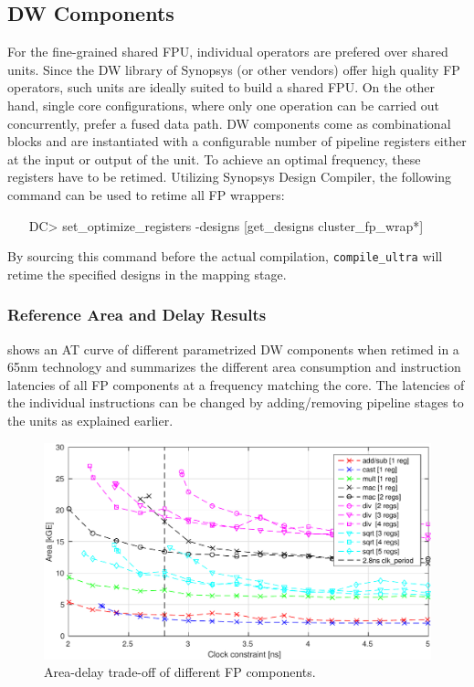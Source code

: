 \documentclass[%
 oneside,      %
 openany,      %
 halfparskip,  %
]{scrbook}
\begin{document}
\subsection{DW Components}

For the fine-grained shared FPU, individual operators are prefered over shared units. Since the DW library of Synopsys (or other vendors) offer high quality FP operators, such units are ideally suited to build a shared FPU. On the other hand, single core configurations, where only one operation can be carried out concurrently, prefer a fused data path.
DW components come as combinational blocks and are instantiated with a configurable number of pipeline registers either at the input or output of the unit. To achieve an optimal frequency, these registers have to be retimed. Utilizing Synopsys Design Compiler, the following command can be used to retime all FP wrappers:

\begin{itemize}
\item [DC>] set\_optimize\_registers -designs [get\_designs cluster\_fp\_wrap*]
\end{itemize}

By sourcing this command before the actual compilation, \texttt{compile\_ultra} will retime the specified designs in the mapping stage.

\subsubsection{Reference Area and Delay Results}
 shows an AT curve of different parametrized DW components when retimed in a 65nm technology and  summarizes the different area consumption and instruction latencies of all FP components at a frequency matching the \rvcore core. The latencies of the individual instructions can be changed by adding/removing pipeline stages to the units as explained earlier.

\begin{figure}[t]
\centering
  \includegraphics[width=0.95\linewidth]{figures/AT_FP_units.pdf}
  \caption{Area-delay trade-off of different \riscv FP components.}
  \label{fig_apu:at_fp_units}
\end{figure}
\end{document}
